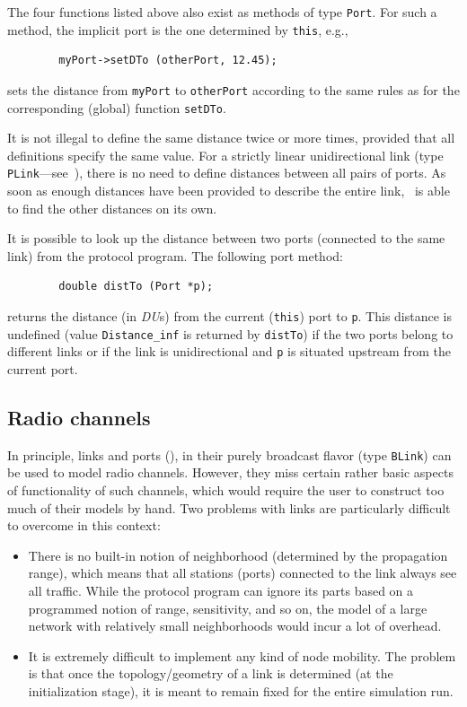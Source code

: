 The four functions listed above also exist as methods of type {\tt Port}.
For such a method, the implicit port is the one determined by {\tt this},
e.g.,
\begin{verbatim}
        myPort->setDTo (otherPort, 12.45);
\end{verbatim}
sets the distance from {\tt myPort} to {\tt otherPort} according to the same
rules as for the corresponding (global) function {\tt setDTo}.

It is not illegal to define the same distance twice or more times, provided
that all definitions specify the same value.
For a strictly linear unidirectional link
(type {\tt PLink}---see~), there is no
need to define distances between all pairs of ports.
As soon as enough distances have been provided to describe the entire
link, \smurph\ is able to find the other distances on its own.

It is possible to look up the distance between two ports (connected to the
same link) from the protocol program.
The following port method:
\begin{verbatim}
        double distTo (Port *p);
\end{verbatim}
returns the distance (in {\em DU\/}s) from the current ({\tt this}) port
to {\tt p}.
This distance is undefined (value {\tt Distance\_inf} is returned by
{\tt distTo}) if the two ports belong to different links or if the
link is unidirectional and {\tt p} is situated upstream from the current
port.

\subsection{Radio channels}
\label{rm_to_rf}

In principle, links and ports (), in their purely broadcast
flavor (type {\tt BLink}) can be used to model radio channels. 
However, they miss certain rather basic aspects of functionality of such
channels, which would require the user to construct too much of
their models by hand.
Two problems with links are particularly difficult to overcome in this context:

\begin{itemize}
\item
There is no built-in notion of neighborhood (determined by the propagation
range), which means that all stations (ports) connected to the link always
see all traffic.
While the protocol program can ignore its parts based on a programmed notion
of range, sensitivity, and so on, the model of a large network with relatively
small neighborhoods would incur a lot of overhead.
\item
It is extremely difficult to implement any kind of node mobility.
The problem is that once the topology/geometry of a link is determined
(at the initialization stage), it is meant to remain fixed for the
entire simulation run.
\end{itemize}

